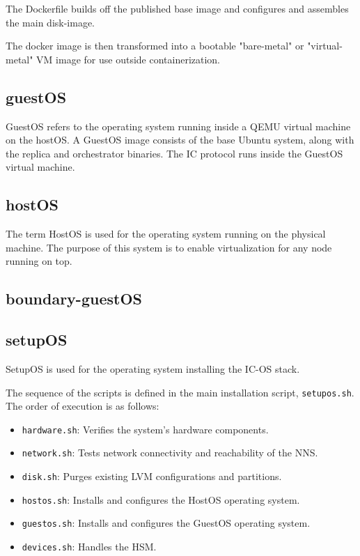 The Dockerfile builds off the published base image and configures and assembles the main disk-image.

The docker image is then transformed into a bootable "bare-metal" or "virtual-metal" VM image for use outside containerization.

\subsection{guestOS}
GuestOS refers to the operating system running inside a QEMU virtual machine on the hostOS. A GuestOS image consists of the base Ubuntu system, along with the replica and orchestrator binaries. The IC protocol runs inside the GuestOS virtual machine.

\subsection{hostOS}

The term HostOS is used for the operating system running on the physical machine. The purpose of this system is to enable virtualization for any node running on top.

\subsection{boundary-guestOS}

\subsection{setupOS}

SetupOS is used for the operating system installing the IC-OS stack.

The sequence of the scripts is defined in the main installation script, \texttt{setupos.sh}. The order of execution is as follows:

\begin{itemize}
  \item \texttt{hardware.sh}: Verifies the system's hardware components.
  \item \texttt{network.sh}: Tests network connectivity and reachability of the NNS.
  \item \texttt{disk.sh}: Purges existing LVM configurations and partitions.
  \item \texttt{hostos.sh}: Installs and configures the HostOS operating system.
  \item \texttt{guestos.sh}: Installs and configures the GuestOS operating system.
  \item \texttt{devices.sh}: Handles the HSM.
\end{itemize}
